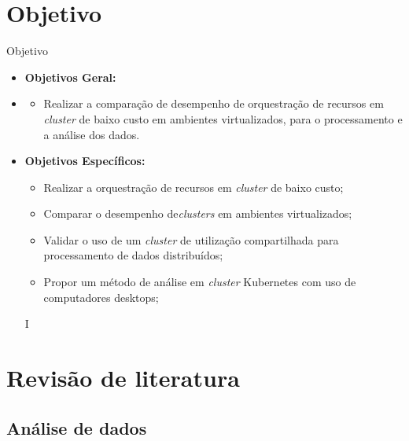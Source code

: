 \documentclass[10pt,brazil]{beamer}
\theoremstyle{definition}
\begin{document}
\section{Objetivo}
\begin{frame}[allowframebreaks]{Objetivo}
  \begin{itemize}
    \item[] \textbf{Objetivos Geral:}
    \item[]
          \begin{itemize}
            \item[] Realizar a comparação de desempenho de orquestração de recursos em \emph{cluster} de baixo custo em ambientes virtualizados, para o processamento e a análise dos dados.
          \end{itemize}
    \item[] \textbf{Objetivos Específicos:}
          \begin{itemize}
            \item Realizar a orquestração de recursos em \emph{cluster} de baixo custo;
            \item Comparar o desempenho de\emph{clusters }em ambientes virtualizados;
            \item Validar o uso de um \emph{cluster} de utilização compartilhada para processamento de dados distribuídos;
            \item Propor um método de análise em \emph{cluster} Kubernetes com uso de computadores desktops;
          \end{itemize}
          I\end{itemize}
\end{frame}


\section{Revisão de literatura}

\subsection{Análise de dados}
\end{document}
